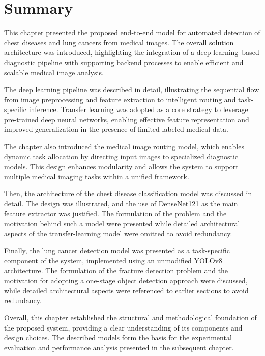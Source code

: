 




\FloatBarrier







\section{Summary}

This chapter presented the proposed end-to-end model for automated detection of chest diseases and lung cancers from medical images. The overall solution architecture was introduced, highlighting the integration of a deep learning–based diagnostic pipeline with supporting backend processes to enable efficient and scalable medical image analysis.

The deep learning pipeline was described in detail, illustrating the sequential flow from image preprocessing and feature extraction to intelligent routing and task-specific inference. Transfer learning was adopted as a core strategy to leverage pre-trained deep neural networks, enabling effective feature representation and improved generalization in the presence of limited labeled medical data.

The chapter also introduced the medical image routing model, which enables dynamic task allocation by directing input images to specialized diagnostic models. This design enhances modularity and allows the system to support multiple medical imaging tasks within a unified framework.

Then, the architecture of the chest disease classification model was discussed in detail. The design was illustrated, and the use of DenseNet121 as the main feature extractor was justified. The formulation of the problem and the motivation behind such a model were presented while detailed architectural aspects of the transfer-learning model were omitted to avoid redundancy.

Finally, the lung cancer detection model was presented as a task-specific component of the system, implemented using an unmodified YOLOv8 architecture. The formulation of the fracture detection problem and the motivation for adopting a one-stage object detection approach were discussed, while detailed architectural aspects were referenced to earlier sections to avoid redundancy.

Overall, this chapter established the structural and methodological foundation of the proposed system, providing a clear understanding of its components and design choices. The described models form the basis for the experimental evaluation and performance analysis presented in the subsequent chapter.